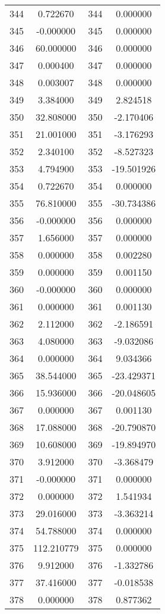 \documentclass[12pt]{article}
\begin{document}
\begin{longtable}{@{}cccc@{}}
344 & 0.722670 & 344 & 0.000000 \\
345 & -0.000000 & 345 & 0.000000 \\
346 & 60.000000 & 346 & 0.000000 \\
347 & 0.000400 & 347 & 0.000000 \\
348 & 0.003007 & 348 & 0.000000 \\
349 & 3.384000 & 349 & 2.824518 \\
350 & 32.808000 & 350 & -2.170406 \\
351 & 21.001000 & 351 & -3.176293 \\
352 & 2.340100 & 352 & -8.527323 \\
353 & 4.794900 & 353 & -19.501926 \\
354 & 0.722670 & 354 & 0.000000 \\
355 & 76.810000 & 355 & -30.734386 \\
356 & -0.000000 & 356 & 0.000000 \\
357 & 1.656000 & 357 & 0.000000 \\
358 & 0.000000 & 358 & 0.002280 \\
359 & 0.000000 & 359 & 0.001150 \\
360 & -0.000000 & 360 & 0.000000 \\
361 & 0.000000 & 361 & 0.001130 \\
362 & 2.112000 & 362 & -2.186591 \\
363 & 4.080000 & 363 & -9.032086 \\
364 & 0.000000 & 364 & 9.034366 \\
365 & 38.544000 & 365 & -23.429371 \\
366 & 15.936000 & 366 & -20.048605 \\
367 & 0.000000 & 367 & 0.001130 \\
368 & 17.088000 & 368 & -20.790870 \\
369 & 10.608000 & 369 & -19.894970 \\
370 & 3.912000 & 370 & -3.368479 \\
371 & -0.000000 & 371 & 0.000000 \\
372 & 0.000000 & 372 & 1.541934 \\
373 & 29.016000 & 373 & -3.363214 \\
374 & 54.788000 & 374 & 0.000000 \\
375 & 112.210779 & 375 & 0.000000 \\
376 & 9.912000 & 376 & -1.332786 \\
377 & 37.416000 & 377 & -0.018538 \\
378 & 0.000000 & 378 & 0.877362 \\

\end{longtable}
\end{document}
